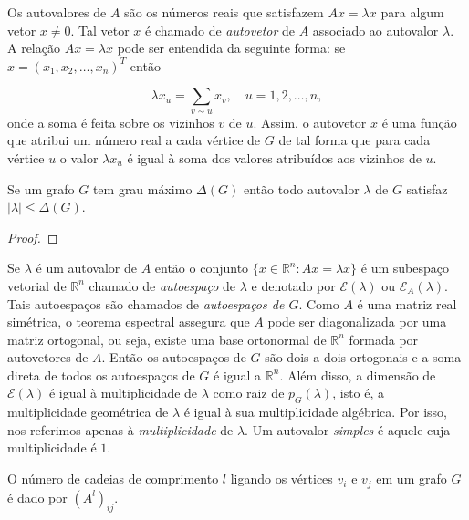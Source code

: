 \documentclass{article}
\begin{document}
Os autovalores de \(A\) são os números reais que satisfazem \(Ax = \lambda x\) para algum vetor \(x \neq 0\). Tal vetor \(x\) é chamado de \emph{autovetor} de \(A\) associado ao autovalor \(\lambda\). A relação \(Ax = \lambda x\) pode ser entendida da seguinte forma: se \(x = (x_1, x_2, \ldots, x_n)^T\) então

\begin{equation}
    \lambda x_u = \sum_{v \sim u} x_v, \quad u = 1, 2, \ldots, n,
\end{equation} onde a soma é feita sobre os vizinhos \(v\) de \(u\). Assim, o autovetor \(x\) é uma função que atribui um número real a cada vértice de \(G\) de tal forma que para cada vértice \(u\) o valor \(\lambda x_u\) é igual à soma dos valores atribuídos aos vizinhos de \(u\).

\begin{prop}
    Se um grafo \(G\) tem grau máximo \(\Delta(G)\) então todo autovalor \(\lambda\) de \(G\) satisfaz \(|\lambda| \leq \Delta(G)\).
\end{prop}

\begin{proof}
    
\end{proof}

Se \(\lambda\) é um autovalor de \(A\) então o conjunto \(\{x \in \mathbb{R}^n : Ax = \lambda x\}\) é um subespaço vetorial de \(\mathbb{R}^n\) chamado de \emph{autoespaço} de \(\lambda\) e denotado por \(\mathcal{E}(\lambda)\) ou \(\mathcal{E}_A(\lambda)\). Tais autoespaços são chamados de \emph{autoespaços de \(G\)}. Como \(A\) é uma matriz real simétrica, o teorema espectral assegura que \(A\) pode ser diagonalizada por uma matriz ortogonal, ou seja, existe uma base ortonormal de \(\mathbb{R}^n\) formada por autovetores de \(A\). Então os autoespaços de \(G\) são dois a dois ortogonais e a soma direta de todos os autoespaços de \(G\) é igual a \(\mathbb{R}^n\). Além disso, a dimensão de \(\mathcal{E}(\lambda)\) é igual à multiplicidade de \(\lambda\) como raiz de \(p_G(\lambda)\), isto é, a multiplicidade geométrica de \(\lambda\) é igual à sua multiplicidade algébrica. Por isso, nos referimos apenas à \emph{multiplicidade} de \(\lambda\). Um autovalor \emph{simples} é aquele cuja multiplicidade é \(1\).

\begin{prop}
    O número de cadeias de comprimento \(l\) ligando os vértices \(v_i\) e \(v_j\) em um grafo \(G\) é dado por \((A^l)_{ij}\).
\end{prop}
\end{document}
